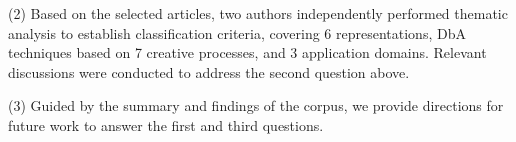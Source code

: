 (2) Based on the selected articles, two authors independently performed thematic analysis\cite{clarke2014thematic} to establish classification criteria, covering 6 representations, DbA techniques based on 7 creative processes, and 3 application domains. Relevant discussions were conducted to address the second question above.  

(3) Guided by the summary and findings of the corpus, we provide directions for future work to answer the first and third questions.























